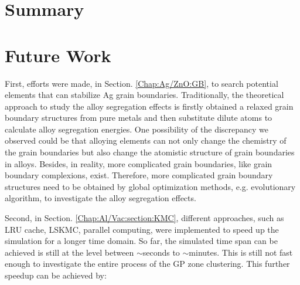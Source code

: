 \section{Summary}

\section{Future Work}
First, efforts were made, in Section. \ref{Chap:Ag/ZnO:GB}, to search potential elements that can stabilize Ag grain boundaries. Traditionally, the theoretical approach to study the alloy segregation effects is firstly obtained a relaxed grain boundary structures from pure metals and then substitute dilute atoms to calculate alloy segregation energies. One possibility of the discrepancy we observed could be that alloying elements can not only change the chemistry of the grain boundaries but also change the atomistic structure of grain boundaries in alloys. Besides, in reality, more complicated grain boundaries, like grain boundary complexions, exist. \cite{cantwell2014grain} Therefore, more complicated grain boundary structures need to be obtained by global optimization methods, e.g. evolutionary algorithm, to investigate the alloy segregation effects.

Second, in Section. \ref{Chap:Al/Vac:section:KMC}, different approaches, such as \ac{LRU} cache, \ac{LSKMC}, parallel computing, were implemented to speed up the simulation for a longer time domain. So far, the simulated time span can be achieved is still at the level between $\sim$seconds to $\sim$minutes. This is still not fast enough to investigate the entire process of the \ac{GP} zone clustering. This further speedup can be achieved by:

